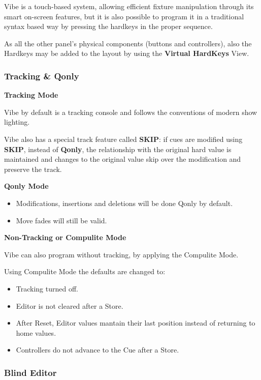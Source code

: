 \documentclass[
]{article}
\begin{document}
Vibe is a touch-based system, allowing efficient fixture manipulation through its smart on-screen features, but it is also possible to program it in a traditional syntax based way by pressing the hardkeys in the proper sequence.

As all the other panel's physical components (buttons and controllers), also the Hardkeys may be added to the layout by using the \textbf{Virtual HardKeys} View.

\hypertarget{tracking-qonly}{%
\subsubsection{Tracking \& Qonly}\label{tracking-qonly}}

\textbf{Tracking Mode}

Vibe by default is a tracking console and follows the conventions of modern show lighting.

Vibe also has a special track feature called \textbf{SKIP}: if cues are modified using \textbf{SKIP}, instead of \textbf{Qonly}, the relationship with the original hard value is maintained and changes to the original value skip over the modification and preserve the track.

\textbf{Qonly Mode}

\begin{itemize}
\item
  Modifications, insertions and deletions will be done Qonly by default.
\item
  Move fades will still be valid.
\end{itemize}

\textbf{Non-Tracking or Compulite Mode}

Vibe can also program without tracking, by applying the Compulite Mode.

Using Compulite Mode the defaults are changed to:

\begin{itemize}
\item
  Tracking turned off.
\item
  Editor is not cleared after a Store.
\item
  After Reset, Editor values mantain their last position instead of returning to home values.
\item
  Controllers do not advance to the Cue after a Store.
\end{itemize}

\hypertarget{blind-editor}{%
\subsubsection{Blind Editor}\label{blind-editor}}
\end{document}

